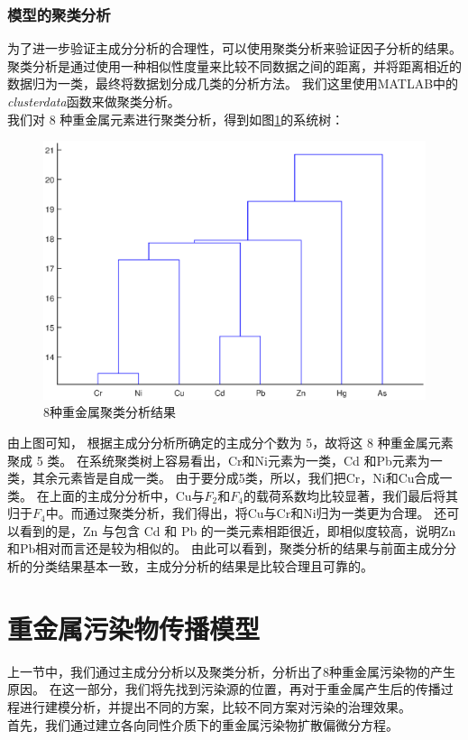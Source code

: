 \documentclass[a4paper]{article}
\begin{document}
\section{模型的聚类分析}
为了进一步验证主成分分析的合理性，可以使用聚类分析来验证因子分析的结果。
聚类分析是通过使用一种相似性度量来比较不同数据之间的距离，并将距离相近的数据归为一类，最终将数据划分成几类的分析方法。
我们这里使用MATLAB中的\emph{clusterdata}\cite{NTCA}函数来做聚类分析。 \\
\indent 我们对 8 种重金属元素进行聚类分析，得到如图\ref{fig:cluster}的系统树：
\begin{figure}[H]
    \centering
    \includegraphics[scale=0.6]{pictures/cluster.eps}
    \caption{8种重金属聚类分析结果}
    \label{fig:cluster}
\end{figure}
由上图可知， 根据主成分分析所确定的主成分个数为 5，故将这 8 种重金属元素聚成 5 类。
在系统聚类树上容易看出，Cr和Ni元素为一类，Cd 和Pb元素为一类，其余元素皆是自成一类。
由于要分成5类，所以，我们把Cr，Ni和Cu合成一类。
在上面的主成分分析中，Cu与$F_2$和$F_4$的载荷系数均比较显著，我们最后将其归于$F_4$中。而通过聚类分析，我们得出，将Cu与Cr和Ni归为一类更为合理。
还可以看到的是，Zn 与包含 Cd 和 Pb 的一类元素相距很近，即相似度较高，说明Zn和Pb相对而言还是较为相似的。
由此可以看到，聚类分析的结果与前面主成分分析的分类结果基本一致，主成分分析的结果是比较合理且可靠的。


\part{重金属污染物传播模型}
上一节中，我们通过主成分分析以及聚类分析，分析出了8种重金属污染物的产生原因。
在这一部分，我们将先找到污染源的位置，再对于重金属产生后的传播过程进行建模分析，并提出不同的方案，比较不同方案对污染的治理效果。\\
\indent 首先，我们通过建立各向同性介质下的重金属污染物扩散偏微分方程。
\end{document}
